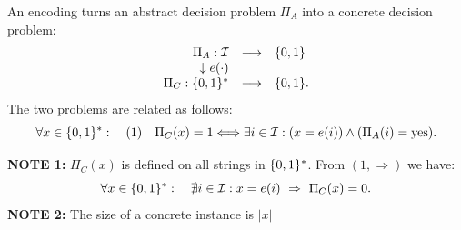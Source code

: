 An encoding turns an abstract decision problem $\Pi_A$ into a concrete decision problem:
\[
\begin{array}{rcl}
\Pi_A:\mathcal I&\longrightarrow&\{0,1\}\\
\downarrow e(\cdot)&&\\
\Pi_C:\{0,1\}^*&\longrightarrow&\{0,1\}.
\end{array}
\]
The two problems are related as follows:
\[
\forall x\in\{0,1\}^*:\quad
\text{(1)}\quad\Pi_C(x)=1\Longleftrightarrow
\exists i\in\mathcal I:(x=e(i))\land(\Pi_A(i)=\mathrm{yes}).
\]

\textbf{NOTE 1:} $\Pi_C(x)$ is defined on all strings in $\{0,1\}^*$. From $(1,\Rightarrow)$ we have:
\[
\forall x\in\{0,1\}^*:\quad\nexists i\in\mathcal I:x=e(i)\ \Rightarrow\ \Pi_C(x)=0.
\]
\textbf{NOTE 2:} The size of a concrete instance is $|x|$
